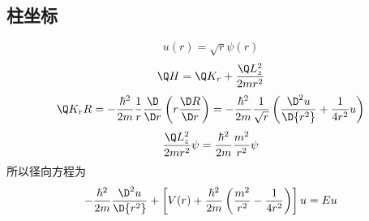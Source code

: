 \subsection{柱坐标}
 \begin{equation}
  u(r) = \sqrt r \psi (r)
\end{equation}
 \begin{equation}
  \Q H = {\Q K_r} + \frac{{\Q L_z^2}}{{2m{r^2}}}
\end{equation}
 \begin{equation}
  {\Q K_r}R =  - \frac{{{\hbar ^2}}}{{2m}}\frac{1}{r}\frac{\D }{{\D r}}\left( {r\frac{{\D R}}{{\D r}}} \right) =  - \frac{{{\hbar ^2}}}{{2m}}\frac{1}{{\sqrt r }}\left( {\frac{{{\D ^2}u}}{{\D {r^2}}} + \frac{1}{{4{r^2}}}u} \right)
\end{equation}
 \begin{equation}
  \frac{{\Q L_z^2}}{{2m{r^2}}}\psi  = \frac{{{\hbar ^2}}}{{2m}}\frac{{{m^2}}}{{{r^2}}}\psi 
\end{equation}
所以径向方程为
 \begin{equation}
   - \frac{{{\hbar ^2}}}{{2m}}\frac{{{\D ^2}u}}{{\D {r^2}}} + \left[ {V(r) + \frac{{{\hbar ^2}}}{{2m}}\left( {\frac{{{m^2}}}{{{r^2}}} - \frac{1}{{4{r^2}}}} \right)} \right]u = Eu
\end{equation}

